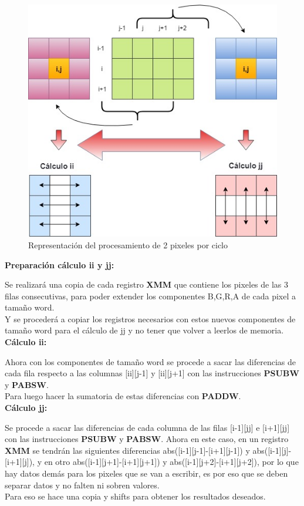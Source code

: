 \begin{figure}[h]
  \begin{center}
	\includegraphics[scale=0.60]{img/bordes1.jpg}
	\caption{Representación del procesamiento de 2 pixeles por ciclo}
	\label{bordes1}
  \end{center}
\end{figure}

{\centering\textbf{Preparación cálculo ii y jj:}}

Se realizará una copia de cada registro \textbf{XMM} que contiene los pixeles de las 3 filas consecutivas, para poder extender los componentes B,G,R,A de cada pixel a tamaño word. \\
Y se procederá a copiar los registros necesarios con estos nuevos componentes de tamaño word para el cálculo de jj y no tener que volver a leerlos de memoria. \\


{\centering\textbf{Cálculo ii:}}

Ahora con los componentes de tamaño word se procede a sacar las diferencias de cada fila respecto a las columnas [ii][j-1] y [ii][j+1] con las instrucciones \textbf{PSUBW} y \textbf{PABSW}. \\
Para luego hacer la sumatoria de estas diferencias con \textbf{PADDW}. \\

{\centering\textbf{Cálculo jj:}}

Se procede a sacar las diferencias de cada columna de las filas [i-1][jj] e [i+1][jj] con las instrucciones \textbf{PSUBW} y \textbf{PABSW}.
Ahora en este caso, en un registro \textbf{XMM} se tendrán las siguientes diferencias  abs([i-1][j-1]-[i+1][j-1]) y abs([i-1][j]-[i+1][j]), y en otro  abs([i-1][j+1]-[i+1][j+1]) y abs([i-1][j+2]-[i+1][j+2]), por lo que hay datos demás para los pixeles que se van a escribir, es por eso que se deben separar datos y no falten ni sobren valores. \\ Para eso se hace una copia y shifts para obtener los resultados deseados.


